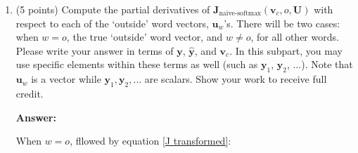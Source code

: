 \documentclass{article}
\newenvironment{answer}{
    {\bf Answer:} \sf \begingroup\color{red}
}{\endgroup}%
\begin{document}
\begin{enumerate}[label=(\alph*)]
\begin{shaded}
\begin{answer}
\begin{enumerate}[label=(\roman*)]
        The first term makes word vector $\bm v_c$ more similar to $\bm u_o$, to ensure that word vector would not be too far away from the origin outside word $o$.

        The second term $\bm U^\top \hat{\bm y}$ is subtracted, which makes the vector closer to the dissimilar word and little away from the current similar word.
        \item
        If there are two vectors $\bm u_x$ and $\bm u_y$, and satisfy
        \[\bm u_x = \alpha \bm u_y\]

        When we do L2 normalization, we will have
        \begin{align*}
            \frac{\bm u_x}{\| \bm u_x \|_2} & = \frac{\bm u_x}{\sqrt{\sum_{i\in x}\bm u_i^2}} \\
            & = \frac{\alpha \bm u_y}{\sqrt{\sum_{i\in y}\bm (\alpha u_i)^2}} \\
            & = \frac{\alpha \bm u_y}{\alpha \sqrt{\sum_{i\in y}\bm u_i^2}} \\
            & = \frac{\bm u_y}{\sqrt{\sum_{i\in y}\bm u_i^2}} \\
            & = \frac{\bm u_y}{\| \bm u_y \|_2}
        \end{align*}
        So the process take away the useful information that the difference of $\bm u_x$ and $\bm u_y$.
        
        When there aren't shch pair of vectors, it would not do such harmness.
    \end{enumerate}
\end{answer}
\end{shaded}

\item (5 points) Compute the partial derivatives of $\bm J_{\text{naive-softmax}}(\bm v_c, o, \bm U)$ with respect to each of the `outside' word vectors, $\bm u_w$'s. There will be two cases: when $w=o$, the true `outside' word vector, and $w \neq o$, for all other words. Please write your answer in terms of $\bm y$, $\hat{\bm y}$, and $\bm v_c$. In this subpart, you may use specific elements within these terms as well (such as $\bm y_1$, $\bm y_2$, $\dots$). Note that $\bm u_w$ is a vector while $\bm y_1, \bm y_2, \dots$ are scalars. Show your work to receive full credit.

\begin{shaded}
\begin{answer}

    When $w = o$, fllowed by equation \ref{J transformed}:


\end{answer}
\end{shaded}
\end{enumerate}
\end{document}
